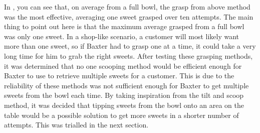 \newline\newline
In \textbf{}, you can see that, on average from a full bowl, the grasp from above method was the most effective, averaging one sweet grasped over ten attempts. The main thing to point out here is that the maximum average grasped from a full bowl was only one sweet. In a shop-like scenario, a customer will most likely want more than one sweet, so if Baxter had to grasp one at a time, it could take a very long time for him to grab the right sweets.
\newline\newline
After testing these grasping methods, it was determined that no one scooping method would be efficient enough for Baxter to use to retrieve multiple sweets for a customer. This is due to the reliability of these methods was not sufficient enough for Baxter to get multiple sweets from the bowl each time. By taking inspiration from the tilt and scoop method, it was decided that tipping sweets from the bowl onto an area on the table would be a possible solution to get more sweets in a shorter number of attempts. This was trialled in the next section.
